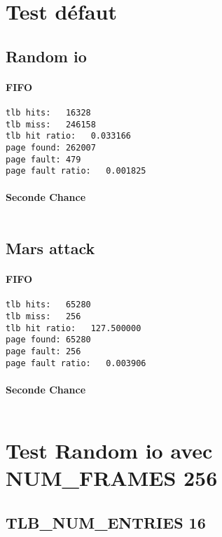 \documentclass{article}
\begin{document}
\section*{Test défaut}
\subsection*{Random io}
\paragraph{FIFO}
\begin{lstlisting}
tlb hits:   16328
tlb miss:   246158
tlb hit ratio:   0.033166
page found: 262007
page fault: 479
page fault ratio:   0.001825
\end{lstlisting}
\paragraph{Seconde Chance}
\begin{lstlisting}

\end{lstlisting}



\subsection*{Mars attack}
\paragraph{FIFO}
\begin{lstlisting}
tlb hits:   65280
tlb miss:   256
tlb hit ratio:   127.500000
page found: 65280
page fault: 256
page fault ratio:   0.003906
\end{lstlisting}

\paragraph{Seconde Chance}
\begin{lstlisting}

\end{lstlisting}

\section*{Test Random io avec NUM_FRAMES  256}

\subsection*{TLB_NUM_ENTRIES  16 }
\end{document}
